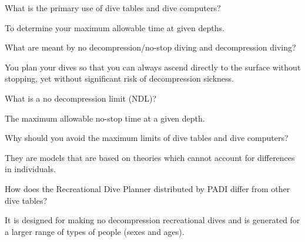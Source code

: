 	\begin{qanda}
		\begin{question}
What is the primary use of dive tables and dive computers?
		\end{question}

		\begin{answer}
To determine your maximum allowable time at given depths.
		\end{answer}
	\end{qanda}

	\begin{qanda}
		\begin{question}
What are meant by no decompression/no-stop diving and decompression diving?
		\end{question}

		\begin{answer}
You plan your dives so that you can always ascend directly to the surface without stopping, yet without significant risk of decompression sickness.
		\end{answer}
	\end{qanda}

	\begin{qanda}
		\begin{question}
What is a no decompression limit (NDL)?
		\end{question}

		\begin{answer}
The maximum allowable no-stop time at a given depth.
		\end{answer}
	\end{qanda}

	\begin{qanda}
		\begin{question}
Why should you avoid the maximum limits of dive tables and dive computers?
		\end{question}

		\begin{answer}
They are models that are based on theories which cannot account for differences in individuals.
		\end{answer}
	\end{qanda}

	\begin{qanda}
		\begin{question}
How does the Recreational Dive Planner distributed by PADI differ from other dive tables?
		\end{question}

		\begin{answer}
It is designed for making no decompression recreational dives and is generated for a larger range of types of people (sexes and ages).
		\end{answer}
	\end{qanda}

